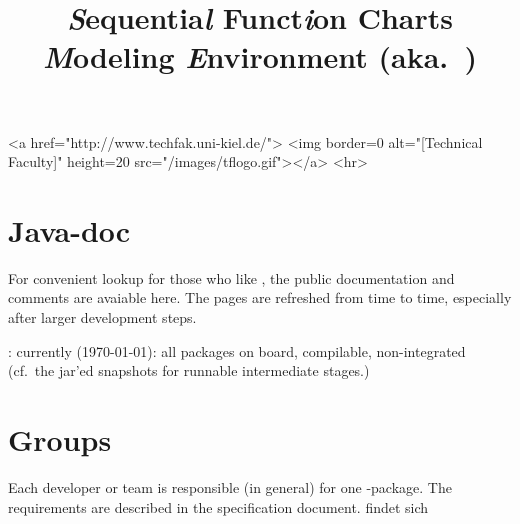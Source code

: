 \documentclass[11pt,german]{article}
\title{{\huge\bf \textsl{S}equentia\textsl{l} Funct\textsl{i}on Charts
    \textsl{M}odeling \textsl{E}nvironment (aka.\ \Slime)}}
\date{}
\begin{document}
\vspace{-2cm}



\begin{rawhtml}
<a href="http://www.techfak.uni-kiel.de/">
  <img border=0 alt="[Technical Faculty]" height=20  src="/images/tflogo.gif"></a>
<hr>
\end{rawhtml}


\maketitle{}










\section*{Java-doc}
\label{sec:javadoc}
\label{sec:html-doc}



For convenient lookup for those who like \javadoc, the public documentation
and comments are avaiable here. The pages are refreshed from time to time,
especially after larger development steps.

\begin{center}
  : currently (\today): all
  packages on board, compilable, non-integrated (cf.\ the jar'ed
  snapshots for runnable intermediate stages.)
\end{center}

















\section*{Groups}
\label{sec:groups}

Each developer or team is responsible (in general) for one \Java-package.
The requirements are described in the specification document.  findet sich
\end{document}
